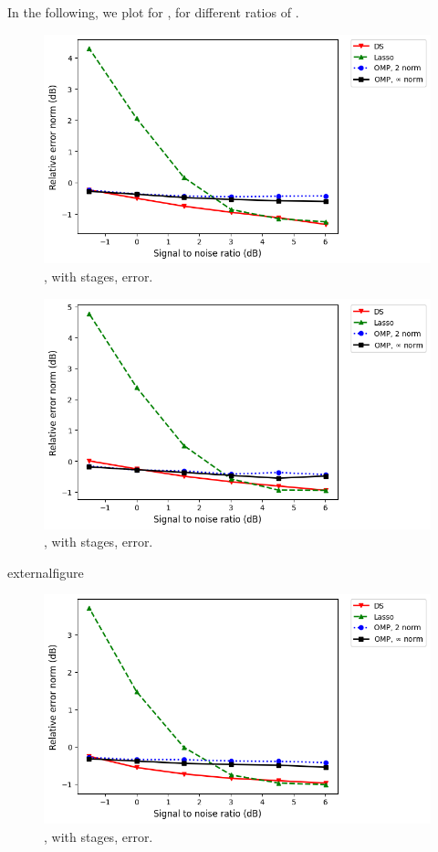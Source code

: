 In the following, we plot for , for different ratios of .
%
\begin {figure} [H]
\includegraphics {error-medium-equal-square-six-usual.png}
\caption {, with  stages, error.}
\end {figure}
%
\begin {figure} [H]
\includegraphics {error-medium-equal-tall-six-usual.png}
\caption {, with  stages, error.}
\end {figure}externalfigure
%
\begin {figure} [H]
\includegraphics {error-medium-equal-wide-six-usual.png}
\caption {, with  stages, error.}
\end {figure}

